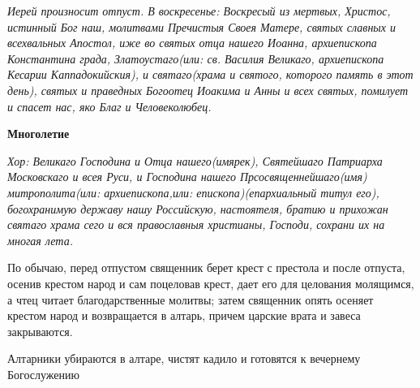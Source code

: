 \itshape  Иерей произносит отпуст. В воскресенье:\normalfont{} Воскресый из мертвых, Христос, истинный Бог наш, молитвами Пречистыя Своея Матере, святых славных и всехвальных Апостол, иже во святых отца нашего Иоанна, архиепископа Константина града, Златоустаго\itshape  (или:\normalfont{} св. Василия Великаго, архиепископа Кесарии Каппадокийския), и святаго\itshape  (храма и святого, которого память в этот день),\normalfont{} святых и праведных Богоотец Иоакима и Анны и всех святых, помилует и спасет нас, яко Благ и Человеколюбец.


\medskip


 \bfseries  Многолетие \normalfont{}


\itshape  Хор:\normalfont{} Великаго Господина и Отца нашего\itshape  (имярек\normalfont{}), Святейшаго Патриарха Московскаго и всея Руси, и Господина нашего Прсосвященнейшаго\itshape  (имя)\normalfont{} митрополита\itshape  (или:\normalfont{} архиепископа,\itshape  или:\normalfont{} епископа)\itshape  (епархиальный титул его),\normalfont{} богохранимую державу нашу Российскую, настоятеля, братию и прихожан святаго храма сего и вся православныя христианы, Господи, сохрани их на многая лета.


\medskip


  По обычаю, перед отпустом священник берет крест с престола и после отпуста, осенив крестом народ и сам поцеловав крест, дает его для целования молящимся, а чтец читает благодарственные молитвы; затем священник опять осеняет крестом народ и возвращается в алтарь, причем царские врата и завеса закрываются.


  Алтарники убираются в алтаре, чистят кадило и готовятся к вечернему Богослужению
\mychapterending
